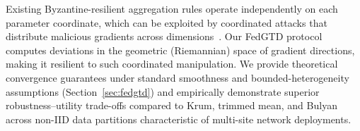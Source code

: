 \documentclass[journal,twoside]{IEEEtran}
\begin{document}
Existing Byzantine-resilient aggregation rules operate independently on
each parameter coordinate, which can be exploited by coordinated attacks that
distribute malicious gradients across dimensions~\cite{baruch2019little}.
Our FedGTD protocol computes deviations in the geometric (Riemannian) space
of gradient directions, making it resilient to such coordinated manipulation.
We provide theoretical convergence guarantees under standard smoothness
and bounded-heterogeneity assumptions (Section~\ref{sec:fedgtd}) and
empirically demonstrate superior robustness--utility trade-offs compared
to Krum, trimmed mean, and Bulyan across non-IID data partitions
characteristic of multi-site network deployments.

\end{document}
